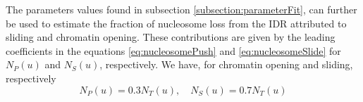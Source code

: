 \documentclass[12pt]{article}
\begin{document}
The parameters values found in subsection \ref{subsection:parameterFit}, can further be used to estimate the fraction of nucleosome loss from the IDR attributed to sliding and
chromatin opening. These contributions are given by the leading coefficients
in the equations \eqref{eq:nucleosomePush} and \eqref{eq:nucleosomeSlide} for $N_P(u)$ and $N_S(u)$, respectively. We have, for
chromatin opening and sliding, respectively
\begin{equation*}
N_P(u) = 0.3N_T(u),\quad N_S(u) = 0.7N_T(u)
\end{equation*}


\end{document}
